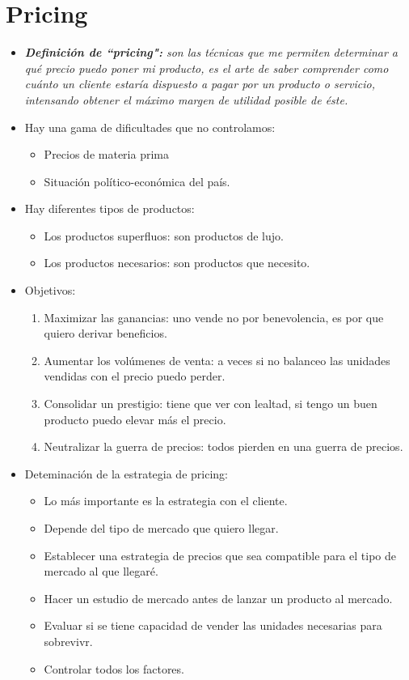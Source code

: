\section{Pricing}
\begin{itemize}
    \item \emph{\textbf{Definición de ``pricing":} son las técnicas que me permiten determinar a qué precio puedo poner mi producto, es el arte de saber comprender como cuánto un cliente estaría dispuesto a pagar por un producto o servicio, intensando obtener el máximo margen de utilidad posible de éste.}
    \item Hay una gama de dificultades que no controlamos:
        \begin{itemize}
            \item Precios de materia prima 
            \item Situación político-económica del país.
        \end{itemize}
    
    \item Hay diferentes tipos de productos:
        \begin{itemize}
            \item Los productos superfluos: son productos de lujo.
            \item Los productos necesarios: son productos que necesito.
        \end{itemize}
    
    \item Objetivos: 
        \begin{enumerate}
            \item Maximizar las ganancias: uno vende no por benevolencia, es por que quiero derivar beneficios.
            \item Aumentar los volúmenes de venta: a veces si no balanceo las unidades vendidas con el precio puedo perder.
            \item Consolidar un prestigio: tiene que ver con lealtad, si tengo un buen producto puedo elevar más el precio.
            \item Neutralizar la guerra de precios: todos pierden en una guerra de precios. 
        \end{enumerate}
    
    \item Deteminación de la estrategia de pricing:
        \begin{itemize}
            \item Lo más importante es la estrategia con el cliente.
            \item Depende del tipo de mercado que quiero llegar. 
            \item Establecer una estrategia de precios que sea compatible para el tipo de mercado al que llegaré.
            \item Hacer un estudio de mercado antes de lanzar un producto al mercado.
            \item Evaluar si se tiene capacidad de vender las unidades necesarias para sobrevivr.
            \item Controlar todos los factores.
        \end{itemize}
    

\end{itemize}

